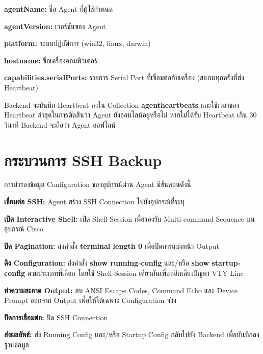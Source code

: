\begin{mycustomenum2}
    \item \textbf{agentName:} ชื่อ Agent ที่ผู้ใช้กำหนด
    \item \textbf{agentVersion:} เวอร์ชันของ Agent
    \item \textbf{platform:} ระบบปฏิบัติการ (win32, linux, darwin)
    \item \textbf{hostname:} ชื่อเครื่องคอมพิวเตอร์
    \item \textbf{capabilities.serialPorts:} รายการ Serial Port ที่เชื่อมต่อกับเครื่อง (สแกนทุกครั้งที่ส่ง Heartbeat)
\end{mycustomenum2}

\hspace*{1.3em}
Backend จะบันทึก Heartbeat ลงใน Collection \textbf{agentheartbeats} และใช้เวลาของ Heartbeat ล่าสุดในการตัดสินว่า Agent ยังออนไลน์อยู่หรือไม่ หากไม่ได้รับ Heartbeat เกิน 30 วินาที Backend จะถือว่า Agent ออฟไลน์

\section{กระบวนการ SSH Backup}
\hspace*{1.3em}
การสำรองข้อมูล Configuration ของอุปกรณ์ผ่าน Agent มีขั้นตอนดังนี้

\begin{mycustomenum2}
    \item \textbf{เชื่อมต่อ SSH:} Agent สร้าง SSH Connection ไปยังอุปกรณ์ที่ระบุ
    \item \textbf{เปิด Interactive Shell:} เปิด Shell Session เพื่อรองรับ Multi-command Sequence บนอุปกรณ์ Cisco
    \item \textbf{ปิด Pagination:} ส่งคำสั่ง \textbf{terminal length 0} เพื่อปิดการแบ่งหน้า Output
    \item \textbf{ดึง Configuration:} ส่งคำสั่ง \textbf{show running-config} และ/หรือ \textbf{show startup-config} ตามประเภทที่เลือก โดยใช้ Shell Session เดียวกันเพื่อหลีกเลี่ยงปัญหา VTY Line
    \item \textbf{ทำความสะอาด Output:} ลบ ANSI Escape Codes, Command Echo และ Device Prompt ออกจาก Output เพื่อให้ได้เฉพาะ Configuration จริง
    \item \textbf{ปิดการเชื่อมต่อ:} ปิด SSH Connection
    \item \textbf{ส่งผลลัพธ์:} ส่ง Running Config และ/หรือ Startup Config กลับไปยัง Backend เพื่อบันทึกลงฐานข้อมูล
\end{mycustomenum2}

